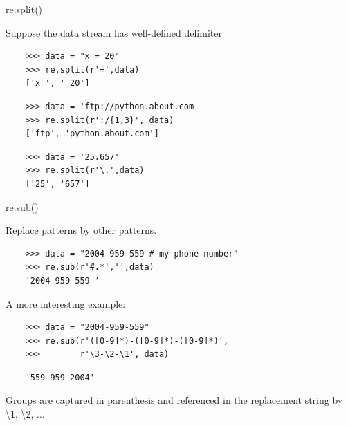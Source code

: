 \documentclass[xcolor=table,10pt]{beamer}
\begin{document}
\begin{frame}[fragile]{re.split()}

  Suppose the data stream has well-defined delimiter

  \vspace{0.4cm}
  \begin{verbatim}
    >>> data = "x = 20"
    >>> re.split(r'=',data)
    ['x ', ' 20']
  \end{verbatim}
  \vspace{0.2cm}
  \pause
  \begin{verbatim} 
    >>> data = 'ftp://python.about.com'
    >>> re.split(r':/{1,3}', data)
    ['ftp', 'python.about.com']
  \end{verbatim}
  \vspace{0.2cm}
  \pause
  \begin{verbatim}
    >>> data = '25.657'
    >>> re.split(r'\.',data)
    ['25', '657']
  \end{verbatim}


\end{frame}



\begin{frame}[fragile]{re.sub()}

  Replace patterns by other patterns.

  \medskip

  \begin{verbatim}
    >>> data = "2004-959-559 # my phone number"
    >>> re.sub(r'#.*','',data)
    '2004-959-559 '
  \end{verbatim}
  \vspace{0.3cm}

  \pause
  A more interesting example:
  
  \medskip

  \begin{verbatim}
    >>> data = "2004-959-559"
    >>> re.sub(r'([0-9]*)-([0-9]*)-([0-9]*)',
    >>>        r'\3-\2-\1', data)
  \end{verbatim}
  \pause
  \vspace{-10pt}
  \begin{verbatim}             
    '559-959-2004'
  \end{verbatim}
  
  \vspace{0.3cm}
  \pause
  \begin{arrowlist}
    \item Groups are captured in parenthesis and referenced in the
      replacement string by \textbackslash1, \textbackslash2, ...
  \end{arrowlist}
\end{frame}
\end{document}
